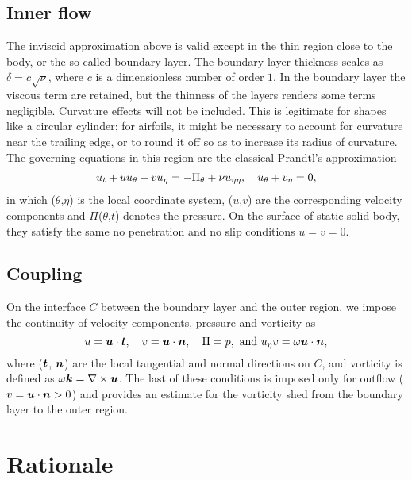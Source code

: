 \subsection{Inner flow}

The inviscid approximation above is valid except in the thin region close to the body, or the so-called boundary layer.
The boundary layer thickness scales as $\delta = c\sqrt{\nu}$, where $c$ is a dimensionless number of order $1$.
In the boundary layer the viscous term are retained, but the thinness of the layers renders some terms negligible.
Curvature effects will not be included.
This is legitimate for shapes like a circular cylinder; for airfoils, it might be necessary to account for curvature near the trailing edge, or to round it off so as to increase its radius of curvature.
The governing equations in this region are the classical Prandtl's approximation
\begin{align}
u_t + uu_{\theta} + vu_{\eta}  =  - \Pi_{\theta} + \nu u_{\eta\eta},  \quad
u_\theta + v_\eta  =  0,
\label{eqn:Prandtl}
\end{align}
in which ($\theta$,$\eta$) is the local coordinate system, ($u$,$v$) are the corresponding velocity components and $\Pi$($\theta$,$t$) denotes the pressure. 
On the surface of static solid body, they satisfy the same no penetration and no slip conditions $u = v = 0$.

\subsection{Coupling}

On the interface $C$ between the boundary layer and the outer region, we impose the continuity of velocity components, pressure and vorticity as
\begin{equation}
 u = \boldsymbol{u} \cdot \boldsymbol{t}, \quad v = \boldsymbol{u} \cdot \boldsymbol{n},  \quad \Pi = p, \text{ and } u_{\eta} v = \omega \boldsymbol{u} \cdot \boldsymbol{n},
\label{eqn:matchingbcs}
\end{equation}
where ($\boldsymbol{t}$, $\boldsymbol{n}$) are the local tangential and normal directions on $C$, and vorticity is defined as $\omega \boldsymbol{k} = \nabla \times \boldsymbol{u}$. 
The last of these conditions is imposed only for outflow ($v = \boldsymbol{u} \cdot \boldsymbol{n} > 0$) and provides an estimate for the vorticity shed from the boundary layer to the outer region.


\section{Rationale}


